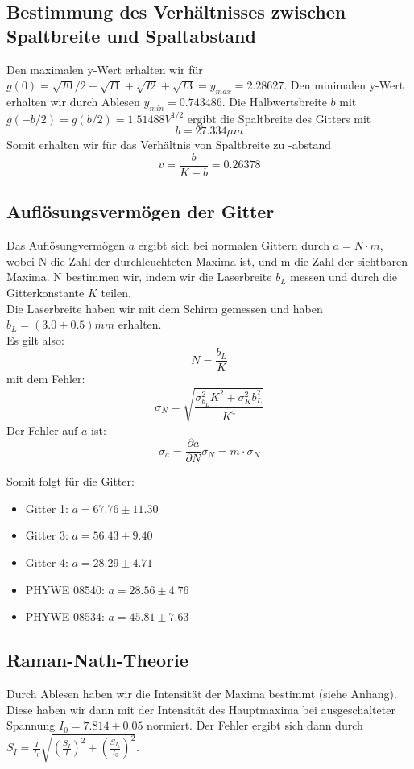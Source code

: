\subsection{Bestimmung des Verh\"altnisses zwischen Spaltbreite und Spaltabstand}

Den maximalen y-Wert erhalten wir für $g\left( 0 \right) = \sqrt{I0}/2+\sqrt{I1}+\sqrt{I2}+\sqrt{I3} = y_{max} = 2.28627 $. Den minimalen y-Wert erhalten wir durch Ablesen $ y_{min} = 0.743486 $. Die Halbwertsbreite $b$ mit $ g\left( - b/2 \right) = g \left( b/2 \right) = 1.51488 V^{1/2} $ ergibt die Spaltbreite des Gitters mit 
$$ b = 27.334 \mu m $$
Somit erhalten wir für das Verhältnis von Spaltbreite zu -abstand
$$ v = \frac{b}{K-b} = 0.26378 $$ %

\subsection{Aufl\"osungsverm\"ogen der Gitter}

Das Aufl\"osungverm\"ogen $a$ ergibt sich bei normalen Gittern durch $a=N\cdot m$, wobei N die Zahl der durchleuchteten Maxima ist, und m die Zahl der sichtbaren Maxima. N bestimmen wir, indem wir die Laserbreite $b_L$ messen und durch die Gitterkonstante $K$ teilen.\\
Die Laserbreite haben wir mit dem Schirm gemessen und haben $b_L = (3.0 \pm 0.5) mm$ erhalten.\\
Es gilt also: $$N = \frac{b_L}{K}$$
mit dem Fehler: $$\sigma_N = \sqrt{\frac{\sigma_{b_L}^2K^2 + \sigma_K^2b_L^2}{K^4}}$$
Der Fehler auf $a$ ist: $$\sigma_a = \frac{\partial a}{\partial N}\sigma_N = m\cdot \sigma_N$$

Somit folgt f\"ur die Gitter:

\begin{itemize}
\item Gitter 1: $ a = 67.76 \pm 11.30 $
\item Gitter 3: $ a = 56.43 \pm 9.40 $
\item Gitter 4: $ a = 28.29 \pm 4.71 $
\item PHYWE 08540: $ a = 28.56 \pm 4.76 $
\item PHYWE 08534: $ a = 45.81 \pm 7.63 $
\end{itemize}


\subsection{Raman-Nath-Theorie}
Durch Ablesen haben wir die Intensität der Maxima bestimmt (siehe Anhang). Diese haben wir dann mit der Intensität des Hauptmaxima bei ausgeschalteter Spannung $I_0 = 7.814 \pm 0.05$ normiert. Der Fehler ergibt sich dann durch $S_I = \frac{I}{I_0}  \sqrt{\left(\frac{S_I}{I}\right)^2 + \left(\frac{S_{I_0}}{I_0}\right)^2}$.

